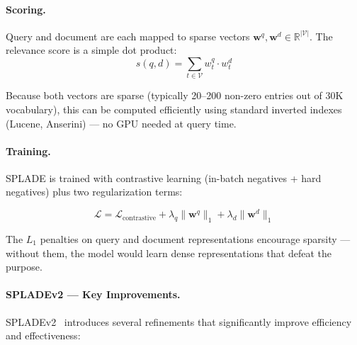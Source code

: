 \paragraph{Scoring.}
\label{scoring.}

Query and document are each mapped to sparse vectors $\mathbf{w}^q, \mathbf{w}^d \in \mathbb{R}^{|\mathcal{V}|}$. The relevance score is a simple dot product: 
\begin{equation}
  s(q, d) = \sum_{t \in \mathcal{V}} w_t^q \cdot w_t^d
\end{equation}

Because both vectors are sparse (typically 20--200 non-zero entries out of 30K vocabulary), this can be computed efficiently using standard inverted indexes (Lucene, Anserini) --- no GPU needed at query time.

\paragraph{Training.}
\label{training.}

SPLADE is trained with contrastive learning (in-batch negatives + hard negatives) plus two regularization terms:

\begin{equation}
  \mathcal{L} = \mathcal{L}_{\text{contrastive}} + \lambda_q \|\mathbf{w}^q\|_1 + \lambda_d \|\mathbf{w}^d\|_1
\end{equation}

The $L_1$ penalties on query and document representations encourage sparsity --- without them, the model would learn dense representations that defeat the purpose.

\paragraph{SPLADEv2 --- Key Improvements.}
\label{spladev2-key-improvements.}

SPLADEv2~\cite{formal2021spladev2} introduces several refinements that significantly improve efficiency and effectiveness:

